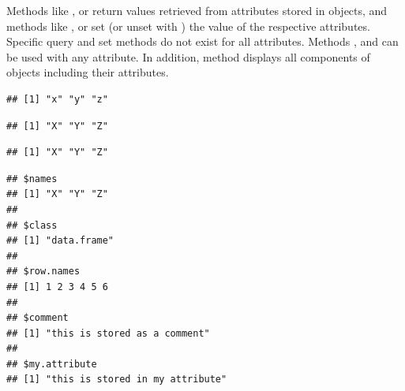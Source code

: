 \documentclass[krantz2]{krantz}\usepackage{knitr}%
\begin{document}
Methods like ,  or  return values retrieved from attributes stored in \Rlang objects, and methods like ,  or  set (or unset with ) the value of the respective attributes. Specific query and set methods do not exist for all attributes. Methods ,  and  can be used with any attribute. In addition, method  displays all components of \Rlang objects including their attributes.

\begin{knitrout}\footnotesize
{}\color{fgcolor}\begin{kframe}
\begin{alltt}
\end{alltt}
\begin{verbatim}
## [1] "x" "y" "z"
\end{verbatim}
\begin{alltt}
 \hlkwb{<-} \hlstd{(}
\end{alltt}
\begin{verbatim}
## [1] "X" "Y" "Z"
\end{verbatim}
\begin{alltt}
 \hlstd{)} 
\end{alltt}
\begin{verbatim}
## [1] "X" "Y" "Z"
\end{verbatim}
\begin{alltt}
 \hlstd{)} \hlkwb{<-} 
\end{alltt}
\begin{verbatim}
## $names
## [1] "X" "Y" "Z"
## 
## $class
## [1] "data.frame"
## 
## $row.names
## [1] 1 2 3 4 5 6
## 
## $comment
## [1] "this is stored as a comment"
## 
## $my.attribute
## [1] "this is stored in my attribute"
\end{verbatim}
\end{kframe}
\end{knitrout}
\end{document}
